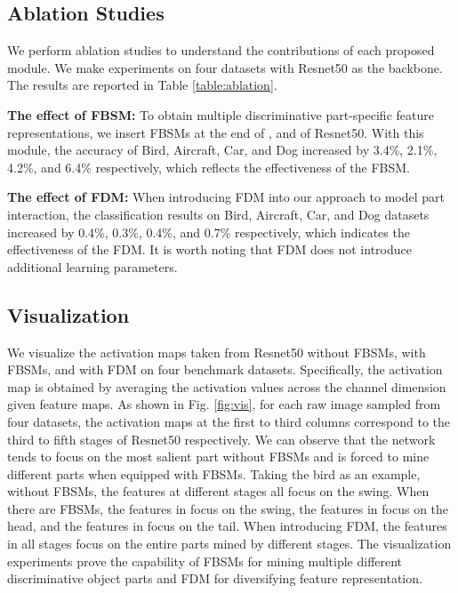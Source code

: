 \documentclass[conference]{IEEEtran}
\begin{document}
	\subsection{Ablation Studies}
	We perform ablation studies to understand the contributions of each proposed module. We make experiments on four datasets with Resnet50 as the backbone.  The results are reported in Table \ref{table:ablation}.
	
	
	\textbf{The effect of FBSM: }
	To obtain multiple discriminative part-specific feature representations, we insert FBSMs at the end of ,  and  of Resnet50. With this module, the accuracy of Bird, Aircraft, Car, and Dog increased by 3.4\%, 2.1\%, 4.2\%, and 6.4\% respectively, which reflects the effectiveness of the FBSM.
	
	\textbf{The effect of FDM: }
	When introducing FDM into our approach to model part interaction, the classification results on Bird, Aircraft, Car, and Dog datasets increased by 0.4\%, 0.3\%, 0.4\%, and 0.7\% respectively, which indicates the effectiveness of the FDM.
	It is worth noting that FDM does not introduce additional learning parameters.
	\subsection{Visualization}
	We visualize the activation maps taken from Resnet50 without FBSMs, with FBSMs, and with FDM on four benchmark datasets. Specifically, the activation map is obtained by averaging the activation values across the channel dimension given feature maps.
	As shown in Fig. \ref{fig:vis}, for each raw image sampled from four datasets, the activation maps at the first to third columns correspond to the third to fifth stages of Resnet50 respectively.
	We can observe that the network tends to focus on the most salient part without FBSMs and is forced to mine different parts when equipped with FBSMs.
	Taking the bird as an example, without FBSMs, the features at different stages all focus on the swing. When there are FBSMs,
	the features in  focus on the swing, the features in  focus on the head, and the features in  focus on the tail. 
	When introducing FDM, the features in all stages focus on the entire parts mined by different stages.
	The visualization experiments prove the capability of FBSMs for mining multiple different discriminative object parts and FDM for diversifying feature representation.
\end{document}
